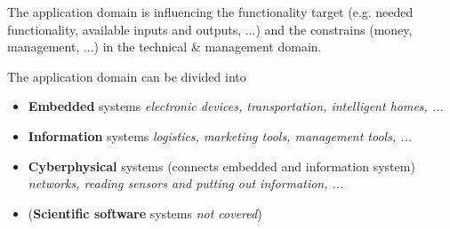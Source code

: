 The application domain is influencing the functionality target (e.g. needed functionality, available inputs and outputs, ...) and the constrains (money, management, ...) in the technical \& management domain.

The application domain can be divided into 
\begin{itemize}[topsep=5pt, itemsep=0pt]
    \item \textbf{Embedded} systems \textit{electronic devices, transportation, intelligent homes, ...}
    \item \textbf{Information} systems \textit{logistics, marketing tools, management tools, ...}
    \item \textbf{Cyberphysical} systems (connects embedded and information system) \textit{networks, reading sensors and putting out information, ...}
    \item (\textbf{Scientific software} systems \textit{not covered})
\end{itemize}
